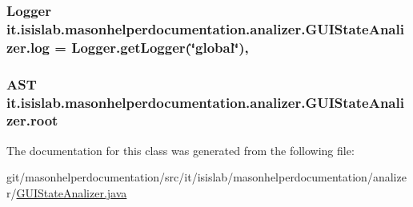 \hypertarget{classit_1_1isislab_1_1masonhelperdocumentation_1_1analizer_1_1_g_u_i_state_analizer_abfa6779bca8bb8d68bd379cc28da4800}{
\subsubsection[{log}]{\setlength{\rightskip}{0pt plus 5cm}Logger it.\-isislab.\-masonhelperdocumentation.\-analizer.\-G\-U\-I\-State\-Analizer.\-log = Logger.\-get\-Logger(\char`\"{}global\char`\"{})\hspace{0.3cm}{\ttfamily [static]}, {\ttfamily [private]}}}\label{classit_1_1isislab_1_1masonhelperdocumentation_1_1analizer_1_1_g_u_i_state_analizer_abfa6779bca8bb8d68bd379cc28da4800}
\hypertarget{classit_1_1isislab_1_1masonhelperdocumentation_1_1analizer_1_1_g_u_i_state_analizer_aef3b13094b99816005f5993cf73e7d43}{
\subsubsection[{root}]{\setlength{\rightskip}{0pt plus 5cm}A\-S\-T it.\-isislab.\-masonhelperdocumentation.\-analizer.\-G\-U\-I\-State\-Analizer.\-root\hspace{0.3cm}{\ttfamily [private]}}}\label{classit_1_1isislab_1_1masonhelperdocumentation_1_1analizer_1_1_g_u_i_state_analizer_aef3b13094b99816005f5993cf73e7d43}


The documentation for this class was generated from the following file\-:\begin{DoxyCompactItemize}
\item 
git/masonhelperdocumentation/src/it/isislab/masonhelperdocumentation/analizer/\hyperlink{_g_u_i_state_analizer_8java}{G\-U\-I\-State\-Analizer.\-java}\end{DoxyCompactItemize}
